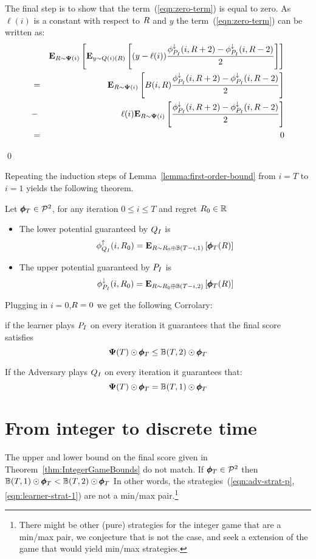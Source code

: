 \documentclass{article}[12pt]
\begin{document}
\begin{enumerate}
The final step is to show that the term~(\ref{eqn:zero-term}) is equal
to zero. As $\ell(i)$ is a constant with respect to $R$ and $y$ the
term~(\ref{eqn:zero-term}) can be written as:
\begin{eqnarray}
&&{\bf E}_{R \sim {\bf \Psi}(i)}\left[ {\bf E}_{y \sim Q(i)(R)}\left[ (y-\ell(i))
   \frac{\phi_{P_I}^{\downarrow}(i,R+2)-\phi_{P_I}^{\downarrow}(i,R-2)}{2} \right] \right]\\
&=&
{\bf E}_{R \sim {\bf \Psi}(i)}\left[ B(i,R)
    \frac{\phi_{P_I}^{\downarrow}(i,R+2)-\phi_{P_I}^{\downarrow}(i,R-2)}{2} \right]\\
  &-& \ell(i) {\bf E}_{R \sim {\bf \Psi}(i)}\left[ 
    \frac{\phi_{P_I}^{\downarrow}(i,R+2)-\phi_{P_I}^{\downarrow}(i,R-2)}{2} \right]\\
  &=& 0
\end{eqnarray}
\end{enumerate}
\qed

Repeating the induction steps of Lemma~\ref{lemma:first-order-bound}
from $i=T$ to $i=1$ yields the following theorem.
\begin{theorem} \label{thm:IntegerGameBounds}
  Let $\pmb{\phi}_{T} \in {\cal P}^{2}$, for any iteration $0 \leq i \leq T$ and
  regret $R_0 \in \mathbb{R}$ 
  \begin{itemize}
  \item
    The lower potential guaranteed by $Q_I$ is
     $$\phi_{Q_I}^{\uparrow}(i,R_0) = {\bf E}_{R \sim R_0 \oplus \mathbb{B}(T-i,1)}\left[ \pmb{\phi}_{T}(R) \right] $$
  \item
    The upper potential guaranteed by $P_I$ is
    $$\phi_{P_I}^{\downarrow}(i,R_0) = {\bf E}_{R \sim R_0 \oplus \mathbb{B}(T-i,2)}\left[ \pmb{\phi}_{T}(R) \right]$$
  \end{itemize}
\end{theorem}

Plugging in $i=0$,$R=0$ we get the following Corrolary:
\begin{corollary}
  if the learner plays $P_I$ on every iteration
  it guarantees that the final score satisfies
  $${\bf \Psi}(T) \odot \pmb{\phi}_{T} \leq \mathbb{B}(T,2) \odot \pmb{\phi}_{T} $$

  If the Adversary plays $Q_I$ on every iteration it guarantees
  that:
  $${\bf \Psi}(T) \odot \pmb{\phi}_{T} = \mathbb{B}(T,1) \odot \pmb{\phi}_{T} $$
\end{corollary}
\section{From integer to discrete time}
\label{sec:discrete}

The upper and lower bound on the final score given in
Theorem~\ref{thm:IntegerGameBounds} do not match. If
$\pmb{\phi}_{T} \in {\cal P}^{2}$ then \linebreak
$\mathbb{B}(T,1) \odot \pmb{\phi}_{T} <\mathbb{B}(T,2) \odot \pmb{\phi}_{T}$ In other
words, the
strategies~(\ref{eqn:adv-strat-p},\ref{eqn:learner-strat-1}) are not a
min/max pair.\footnote{There might be other (pure) strategies for the
  integer game that are a min/max pair, we conjecture that is not the
  case, and seek a extension of the game that would yield min/max
  strategies.}
\end{document}
